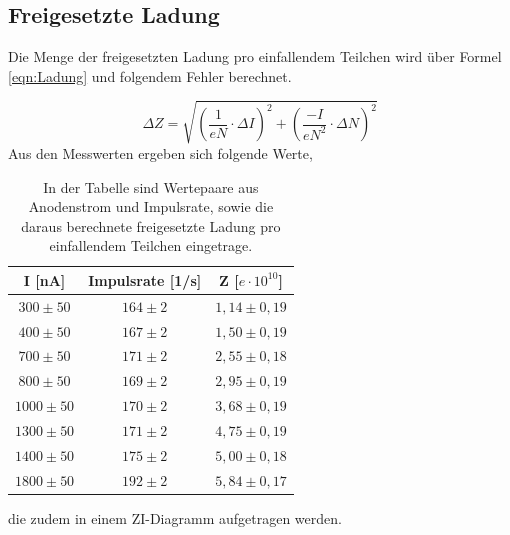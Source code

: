 \documentclass[titlepage = firstcover]{scrartcl}
\begin{document}
            \FloatBarrier
            \noindent



        \subsection{Freigesetzte Ladung}
            Die Menge der freigesetzten Ladung pro einfallendem Teilchen wird über Formel \ref{eqn:Ladung} und folgendem Fehler berechnet.

            \begin{equation*}
                \Delta Z = \sqrt{\left(\frac{1}{eN} \cdot \Delta I\right)^2 + \left( \frac{-I}{eN^2} \cdot \Delta N\right)^2}
            \end{equation*}
            \noindent
            Aus den Messwerten ergeben sich folgende Werte,

            \begin{table}[h]
                \centering
                \caption{In der Tabelle sind Wertepaare aus Anodenstrom und Impulsrate, sowie die daraus berechnete freigesetzte Ladung pro einfallendem Teilchen eingetrage.}
                \label{tab:Ladungen}
                \begin{tabular}{c c c }
                    \toprule
                    {I [nA]} & {Impulsrate [1/s]} & {Z [$e \cdot 10^{10}$]} \\
                    \midrule
                    $300 \pm 50$ & $164 \pm 2$ & $1,14 \pm 0,19$\\
                    $400 \pm 50$ & $167 \pm 2$ & $1,50 \pm 0,19$\\
                    $700 \pm 50$ & $171 \pm 2$ & $2,55 \pm 0,18$\\
                    $800 \pm 50$ & $169 \pm 2$ & $2,95 \pm 0,19$\\
                    $1000 \pm 50$ & $170 \pm 2$ & $3,68 \pm 0,19$\\
                    $1300 \pm 50$ & $171 \pm 2$ & $4,75 \pm 0,19$\\
                    $1400 \pm 50$ & $175 \pm 2$ & $5,00 \pm 0,18$\\
                    $1800 \pm 50$ & $192 \pm 2$ & $5,84 \pm 0,17$\\
                     
                    \bottomrule
                \end{tabular}
            \end{table}
            \noindent
            die zudem in einem ZI-Diagramm aufgetragen werden.
\end{document}
